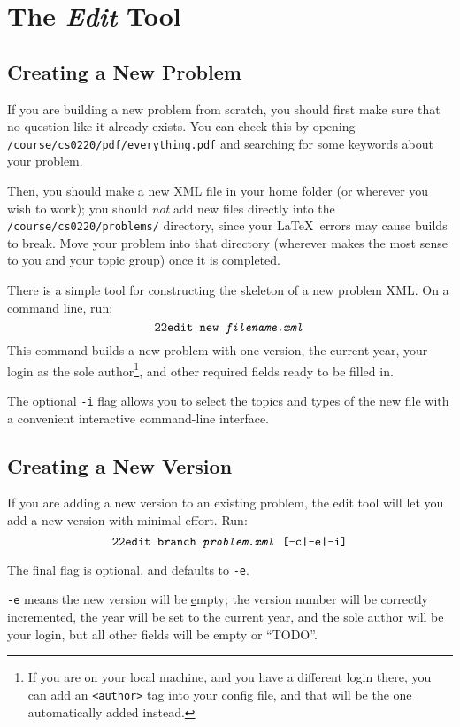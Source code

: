 \section{The \textit{Edit} Tool}
  \subsection{Creating a New Problem}
    If you are building a new problem from scratch, you should first make 
    sure that no question like it already exists. You can check this by 
    opening \texttt{/course/cs0220/pdf/everything.pdf} and searching
    for some keywords about your problem. 
    
    Then, you should make a new XML file in your home folder (or wherever
    you wish to work); you should \textit{not} add new files directly into
    the \texttt{/course/cs0220/problems/} directory, since your \LaTeX\
    errors may cause builds to break. Move your problem into that directory
    (wherever makes the most sense to you and your topic group) once it is
    completed.
    
    There is a simple tool for constructing the skeleton of a new problem 
    XML. On a command line, run: 
    \[\texttt{22edit }\texttt{new \textit{filename.xml}}\] 
    This command builds a new problem with one version, the current year, 
    your login as the sole 
    author\footnote{If you are on your local machine, and you have a
    different login there, you can add an \texttt{<author>} tag into your
    config file, and that will be the one automatically added instead.}, 
    and other required fields ready to be filled in.
    
    The optional \texttt{-i} flag allows you to select the topics and 
    types of the new file with a convenient interactive command-line interface. 
    
  \subsection{Creating a New Version}
    If you are adding a new version to an existing problem, the edit tool 
    will let you add a new version with minimal effort. Run: 
    \[\texttt{22edit }\texttt{branch \textit{problem.xml} [-c|-e|-i]}\]
    
    The final flag is optional, and defaults to \texttt{-e}.
    
    \texttt{-e} means the new version will be \underline{e}mpty; the 
    version number will be correctly incremented, the year will be set to 
    the current year, and the sole author will be your login, but all 
    other fields will be empty or ``TODO''.
    
